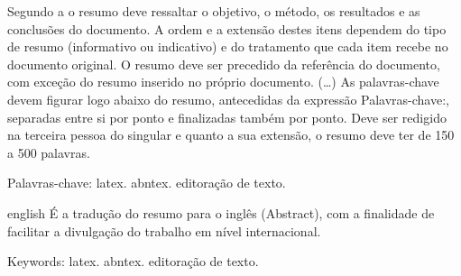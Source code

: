\setlength{\absparsep}{18pt} 
\begin{resumo}[Resumo]
 Segundo a  o resumo deve ressaltar o
 objetivo, o método, os resultados e as conclusões do documento. A ordem e a extensão
 destes itens dependem do tipo de resumo (informativo ou indicativo) e do
 tratamento que cada item recebe no documento original. O resumo deve ser
 precedido da referência do documento, com exceção do resumo inserido no
 próprio documento. (\ldots) As palavras-chave devem figurar logo abaixo do
 resumo, antecedidas da expressão Palavras-chave:, separadas entre si por
 ponto e finalizadas também por ponto. Deve ser redigido na terceira
 pessoa do singular e quanto a sua extensão, o resumo deve ter de 150 a 500
 palavras.

 Palavras-chave: latex. abntex. editoração de texto.
\end{resumo}

\begin{resumo}[Abstract]
 \begin{otherlanguage*}{english}
  É a tradução do resumo para o inglês (Abstract), com a finalidade de facilitar a
  divulgação do trabalho em nível internacional.
 \end{otherlanguage*}

 Keywords: latex. abntex. editoração de texto.
\end{resumo}
